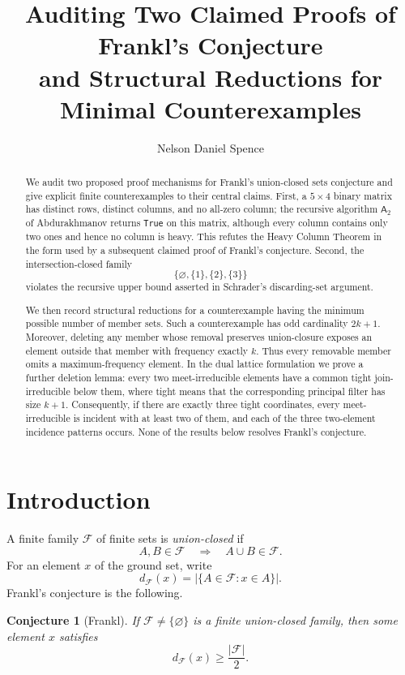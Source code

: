 \documentclass[11pt]{amsart}
\title[Auditing two claimed proofs of Frankl's conjecture]
{Auditing Two Claimed Proofs of Frankl's Conjecture\\
and Structural Reductions for Minimal Counterexamples}
\author{Nelson Daniel Spence}
\newtheorem{conjecture}[theorem]{Conjecture}
\theoremstyle{definition}
\theoremstyle{remark}
\newcommand{\F}{\mathcal F}
\newcommand{\Aalg}{\mathsf A_2}
\newcommand{\True}{\texttt{True}}
\begin{document}
\begin{abstract}
We audit two proposed proof mechanisms for Frankl's union-closed sets conjecture and give explicit finite counterexamples to their central claims. First, a $5\times4$ binary matrix has distinct rows, distinct columns, and no all-zero column; the recursive algorithm $\Aalg$ of Abdurakhmanov returns \True{} on this matrix, although every column contains only two ones and hence no column is heavy. This refutes the Heavy Column Theorem in the form used by a subsequent claimed proof of Frankl's conjecture. Second, the intersection-closed family
\[
  \{\varnothing,\{1\},\{2\},\{3\}\}
\]
violates the recursive upper bound asserted in Schrader's discarding-set argument.

We then record structural reductions for a counterexample having the minimum possible number of member sets. Such a counterexample has odd cardinality $2k+1$. Moreover, deleting any member whose removal preserves union-closure exposes an element outside that member with frequency exactly $k$. Thus every removable member omits a maximum-frequency element. In the dual lattice formulation we prove a further deletion lemma: every two meet-irreducible elements have a common tight join-irreducible below them, where tight means that the corresponding principal filter has size $k+1$. Consequently, if there are exactly three tight coordinates, every meet-irreducible is incident with at least two of them, and each of the three two-element incidence patterns occurs. None of the results below resolves Frankl's conjecture.
\end{abstract}

\maketitle

\section{Introduction}

A finite family $\F$ of finite sets is \emph{union-closed} if
\[
  A,B\in\F \quad\Longrightarrow\quad A\cup B\in\F.
\]
For an element $x$ of the ground set, write
\[
  d_{\F}(x)=\bigl|\{A\in\F:x\in A\}\bigr|.
\]
Frankl's conjecture is the following.

\begin{conjecture}[Frankl]
If $\F\ne\{\varnothing\}$ is a finite union-closed family, then some element $x$ satisfies
\[
  d_{\F}(x)\ge \frac{|\F|}{2}.
\]
\end{conjecture}
\end{document}
